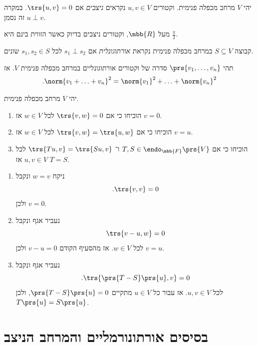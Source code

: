 \documentclass[a4paper,10pt,twoside,openany]{book}
\begin{document}
\begin{definition}
יהי
$V$
מרחב מכפלה פנימית.
וקטורים
$u,v \in V$
נקראים
\emph{ניצבים}
אם
$\trs{u,v} = 0$.
במקרה זה נסמן
$u \perp v$.
\end{definition}

\begin{remark}
מעל
$\mbb{R}$,
וקטורים ניצבים בדיוק כאשר הזווית בינם היא
$\frac{\pi}{2}$.
\end{remark}

\begin{definition}
קבוצה
$S \subseteq V$
במרחב מכפלה פנימית נקראת
\emph{אורתוגונלית}
אם
$s_1 \perp s_2$
לכל
$s_1, s_2 \in S$
שונים.
\end{definition}

\begin{theorem}[פיתגורס]
תהי
$\prs{v_1, \ldots, v_n}$
סדרה של וקטורים אורתוגונליים במרחב מכפלה פנימית
$V$.
אז
\begin{align*}
\text{.} \norm{v_1 + \ldots + v_n}^2 = \norm{v_1}^2 + \ldots + \norm{v_n}^2
\end{align*}
\end{theorem}

\begin{exercisechap}
יהי
$V$
מרחב מכפלה פנימית.
\begin{enumerate}
\item הוכיחו כי אם
$\trs{v,w} = 0$
לכל
$w \in V$
אז
$v = 0$.
\item הוכיחו כי אם
$\trs{v,w} = \trs{u,w}$
לכל
$w \in V$
אז
$v=u$.
\item הוכיחו כי אם
$T,S \in \endo_{\mbb{F}}\prs{V}$
ו־%
$\trs{Tu,v} = \trs{Su,v}$
לכל
$u,v \in V$
אז
$T = S$.
\end{enumerate}
\end{exercisechap}

\begin{solution}
\begin{enumerate}
\item ניקח
$w = v$
ונקבל
\[\text{.} \trs{v,v} = 0\]
ולכן
$v = 0$.
\item נעביר אגף ונקבל
\[\trs{v-u, w} = 0\]
לכל
$w \in V$.
אז מהסעיף הקודם
$v-u = 0$
ולכן
$v = u$.
\item נעביר אגף ונקבל
\[\text{.} \trs{\prs{T-S}\prs{u},v} = 0\]
לכל
$u,v \in V$.
אז עבור כל
$u \in V$
מתקיים
$\prs{T-S}\prs{u} = 0$,
ולכן
$T\prs{u} = S\prs{u}$.
\end{enumerate}
\end{solution}

\section{בסיסים אורתונורמליים והמרחב הניצב}
\end{document}
